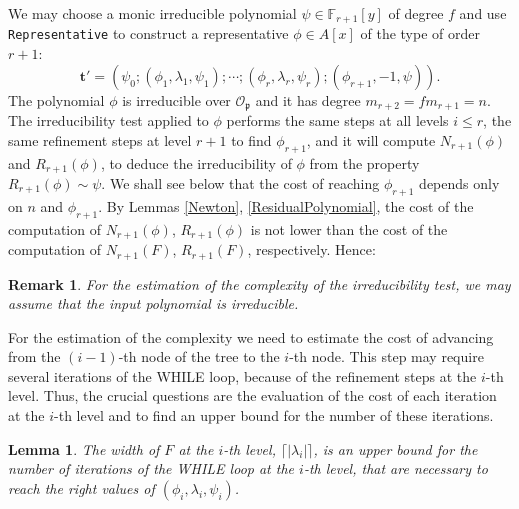 \documentclass{amsart}
\newtheorem{lemma}[theorem]{Lemma}
\newtheorem{remark}[theorem]{Remark}
\begin{document}
We may choose a monic irreducible polynomial $\psi\in{\mathbb F}_{r+1}[y]$ of degree $f$ and use {\tt Representative} to construct a representative $\phi\in A[x]$ of the type of order $r+1$:
$${\mathbf{t}}'=(\psi_0;(\phi_1,\lambda_1,\psi_1);\cdots;(\phi_r,\lambda_r,\psi_r);(\phi_{r+1},-1,\psi)). 
$$ 
The polynomial $\phi$ is irreducible over ${\mathcal{O}}_{\mathfrak{p}}$ and it has degree $m_{r+2}=fm_{r+1}=n$. The irreducibility test applied to $\phi$ performs the same steps at all levels $i\le r$, the same refinement steps at level $r+1$ to find $\phi_{r+1}$, and it will compute $N_{r+1}(\phi)$ and $R_{r+1}(\phi)$, to deduce the irreducibility
of $\phi$ from the property $R_{r+1}(\phi)\sim \psi$. We shall see below that the cost of reaching $\phi_{r+1}$ depends only on $n$ and $\phi_{r+1}$. By Lemmas \ref{Newton}, \ref{ResidualPolynomial}, the cost of the computation of $N_{r+1}(\phi)$, $R_{r+1}(\phi)$ is not lower than the cost of the computation of $N_{r+1}(F)$, $R_{r+1}(F)$, respectively. Hence:

\begin{remark}\label{irreducible}\rm
For the estimation of the complexity of the irreducibility test, we may assume that the input polynomial is irreducible.
\end{remark}

For the estimation of the complexity we need to estimate the cost of advancing from the $(i-1)$-th node of the tree to the $i$-th node. This step may require several iterations of the WHILE loop, because of the refinement steps
at the $i$-th level. Thus, the crucial questions are the evaluation of the cost of each iteration at the $i$-th level and to find an upper bound for the number of these iterations. 

\begin{lemma}\label{refinement}
The width of $F$ at the $i$-th level, $\lceil |\lambda_i|
\rceil$, is an upper bound for the number of iterations of the WHILE loop at the $i$-th level, that are necessary to reach the right values of  $(\phi_i,\lambda_i,\psi_i)$.
\end{lemma}
\end{document}
